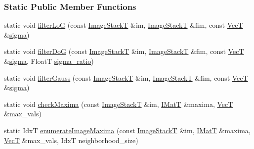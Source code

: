 \subsubsection*{Static Public Member Functions}
\begin{DoxyCompactItemize}
\item 
static void \hyperlink{classboxxer_1_1Boxxer2D_a15a892fce4934b21f5c1fcba2c8cb285}{filter\+LoG} (const \hyperlink{classboxxer_1_1Boxxer2D_a35da86be183f5f24cb3d13cbf7cf45ee}{Image\+StackT} \&im, \hyperlink{classboxxer_1_1Boxxer2D_a35da86be183f5f24cb3d13cbf7cf45ee}{Image\+StackT} \&fim, const \hyperlink{classboxxer_1_1Boxxer2D_aeb45bfe57b8975660fc7076a2794acf8}{VecT} \&\hyperlink{classboxxer_1_1Boxxer2D_a925fe4151cca3a34cba36f1a10b8e382}{sigma})
\item 
static void \hyperlink{classboxxer_1_1Boxxer2D_a42be1c0ec28f5e56b56466c23a691330}{filter\+DoG} (const \hyperlink{classboxxer_1_1Boxxer2D_a35da86be183f5f24cb3d13cbf7cf45ee}{Image\+StackT} \&im, \hyperlink{classboxxer_1_1Boxxer2D_a35da86be183f5f24cb3d13cbf7cf45ee}{Image\+StackT} \&fim, const \hyperlink{classboxxer_1_1Boxxer2D_aeb45bfe57b8975660fc7076a2794acf8}{VecT} \&\hyperlink{classboxxer_1_1Boxxer2D_a925fe4151cca3a34cba36f1a10b8e382}{sigma}, FloatT \hyperlink{classboxxer_1_1Boxxer2D_a0fffedee4a39644c5c48fba99e297111}{sigma\+\_\+ratio})
\item 
static void \hyperlink{classboxxer_1_1Boxxer2D_ab02b4b192594387e705630aec04befcc}{filter\+Gauss} (const \hyperlink{classboxxer_1_1Boxxer2D_a35da86be183f5f24cb3d13cbf7cf45ee}{Image\+StackT} \&im, \hyperlink{classboxxer_1_1Boxxer2D_a35da86be183f5f24cb3d13cbf7cf45ee}{Image\+StackT} \&fim, const \hyperlink{classboxxer_1_1Boxxer2D_aeb45bfe57b8975660fc7076a2794acf8}{VecT} \&\hyperlink{classboxxer_1_1Boxxer2D_a925fe4151cca3a34cba36f1a10b8e382}{sigma})
\item 
static void \hyperlink{classboxxer_1_1Boxxer2D_a627557e88133731402ac74c03940141f}{check\+Maxima} (const \hyperlink{classboxxer_1_1Boxxer2D_a35da86be183f5f24cb3d13cbf7cf45ee}{Image\+StackT} \&im, \hyperlink{classboxxer_1_1Boxxer2D_ad6e571d3e7685b8c634661e03382a32f}{I\+MatT} \&maxima, \hyperlink{classboxxer_1_1Boxxer2D_aeb45bfe57b8975660fc7076a2794acf8}{VecT} \&max\+\_\+vals)
\item 
static IdxT \hyperlink{classboxxer_1_1Boxxer2D_adc8ce4f6cb5af431aae17763d89042a5}{enumerate\+Image\+Maxima} (const \hyperlink{classboxxer_1_1Boxxer2D_a35da86be183f5f24cb3d13cbf7cf45ee}{Image\+StackT} \&im, \hyperlink{classboxxer_1_1Boxxer2D_ad6e571d3e7685b8c634661e03382a32f}{I\+MatT} \&maxima, \hyperlink{classboxxer_1_1Boxxer2D_aeb45bfe57b8975660fc7076a2794acf8}{VecT} \&max\+\_\+vals, IdxT neighborhood\+\_\+size)
\end{DoxyCompactItemize}
